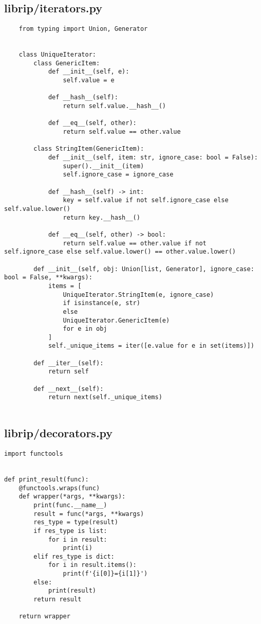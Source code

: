 \documentclass{article}
\begin{document}
\subsection{librip/iterators.py}
\begin{verbatim}
    from typing import Union, Generator


    class UniqueIterator:
        class GenericItem:
            def __init__(self, e):
                self.value = e
    
            def __hash__(self):
                return self.value.__hash__()
    
            def __eq__(self, other):
                return self.value == other.value
    
        class StringItem(GenericItem):
            def __init__(self, item: str, ignore_case: bool = False):
                super().__init__(item)
                self.ignore_case = ignore_case
    
            def __hash__(self) -> int:
                key = self.value if not self.ignore_case else self.value.lower()
                return key.__hash__()
    
            def __eq__(self, other) -> bool:
                return self.value == other.value if not self.ignore_case else self.value.lower() == other.value.lower()
    
        def __init__(self, obj: Union[list, Generator], ignore_case: bool = False, **kwargs):
            items = [
                UniqueIterator.StringItem(e, ignore_case)
                if isinstance(e, str)
                else
                UniqueIterator.GenericItem(e)
                for e in obj
            ]
            self._unique_items = iter([e.value for e in set(items)])
    
        def __iter__(self):
            return self
    
        def __next__(self):
            return next(self._unique_items)
    
\end{verbatim}

\subsection{librip/decorators.py}
\begin{verbatim}
import functools


def print_result(func):
    @functools.wraps(func)
    def wrapper(*args, **kwargs):
        print(func.__name__)
        result = func(*args, **kwargs)
        res_type = type(result)
        if res_type is list:
            for i in result:
                print(i)
        elif res_type is dict:
            for i in result.items():
                print(f'{i[0]}={i[1]}')
        else:
            print(result)
        return result

    return wrapper

\end{verbatim}
\end{document}
